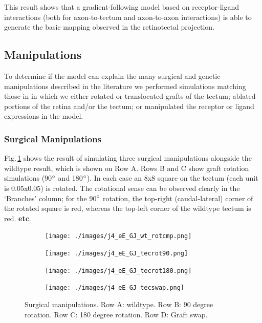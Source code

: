 \documentclass[11pt, a4paper]{article}
\begin{document}
This result shows that a gradient-following model based on receptor-ligand
interactions (both for axon-to-tectum and axon-to-axon interactions) is
able to generate the basic mapping observed in the retinotectal projection.

\subsection*{Manipulations}

To determine if the model can explain the many surgical and genetic
manipulations described in the literature
\citep*[for a review, see][]{goodhill_retinotectal_1999} we performed
simulations matching those in \citet{simpson_simple_2011} in which we either
rotated or translocated grafts of the tectum; ablated portions of the retina
and/or the tectum; or manipulated the receptor or ligand expressions in the
model.

\subsubsection*{Surgical Manipulations}

Fig.\,\ref{f:surg1} shows the result of simulating three surgical
manipulations alongside the wildtype result, which is shown on Row A. Rows B
and C show graft rotation simulations (90$\degree$ and 180$\degree$). In each
case an 8x8 square on the tectum (each unit is 0.05x0.05) is rotated. The
rotational sense can be observed clearly in the `Branches' column; for the
90$\degree$ rotation, the top-right (caudal-lateral) corner of the rotated
square is red, whereas the top-left corner of the wildtype tectum is red. \textbf{etc}.



\begin{figure}
\begin{subfigure}{\linewidth}
\texttt{[image: ./images/j4\_eE\_GJ\_wt\_rotcmp.png]}
\end{subfigure}
\begin{subfigure}{\linewidth}
\texttt{[image: ./images/j4\_eE\_GJ\_tecrot90.png]}
\end{subfigure}
\begin{subfigure}{\linewidth}
\texttt{[image: ./images/j4\_eE\_GJ\_tecrot180.png]}
\end{subfigure}
\begin{subfigure}{\linewidth}
\texttt{[image: ./images/j4\_eE\_GJ\_tecswap.png]}
\end{subfigure}
\caption{Surgical manipulations. Row A: wildtype. Row B: 90 degree
rotation. Row C: 180 degree rotation. Row D: Graft swap.}
\label{f:surg1}
\end{figure}
\end{document}
